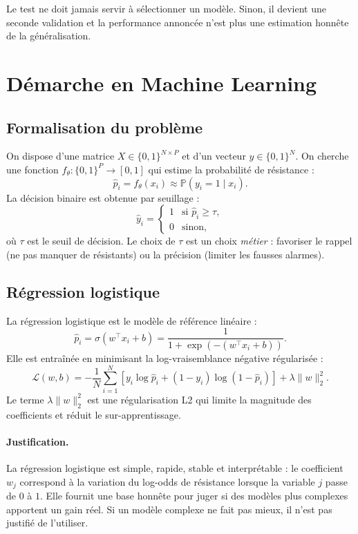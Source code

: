\documentclass[11pt,a4paper]{article}
\begin{document}
Le test ne doit jamais servir à sélectionner un modèle. Sinon, il devient une seconde validation et la performance annoncée n'est plus une estimation honnête de la généralisation.

\section{Démarche en Machine Learning}

\subsection{Formalisation du problème}

On dispose d'une matrice \(X \in \{0,1\}^{N \times P}\) et d'un vecteur \(y \in \{0,1\}^N\). On cherche une fonction \(f_\theta : \{0,1\}^P \to [0,1]\) qui estime la probabilité de résistance :
\[
\hat p_i = f_\theta(x_i) \approx \mathbb{P}(y_i = 1 \mid x_i).
\]
La décision binaire est obtenue par seuillage :
\[
\hat y_i =
\begin{cases}
1 & \text{si } \hat p_i \ge \tau,\\
0 & \text{sinon},
\end{cases}
\]
où \(\tau\) est le seuil de décision. Le choix de \(\tau\) est un choix \emph{métier} : favoriser le rappel (ne pas manquer de résistants) ou la précision (limiter les fausses alarmes).

\subsection{Régression logistique}

La régression logistique est le modèle de référence linéaire :
\[
\hat p_i = \sigma(w^\top x_i + b) = \frac{1}{1 + \exp\left(-(w^\top x_i + b)\right)}.
\]
Elle est entraînée en minimisant la log-vraisemblance négative régularisée :
\[
\mathcal{L}(w,b)
= -\frac{1}{N}\sum_{i=1}^N
\left[
y_i \log \hat p_i + (1-y_i)\log(1-\hat p_i)
\right]
+ \lambda \|w\|_2^2.
\]
Le terme \(\lambda \|w\|_2^2\) est une régularisation L2 qui limite la magnitude des coefficients et réduit le sur-apprentissage.

\paragraph{Justification.}
La régression logistique est simple, rapide, stable et interprétable : le coefficient \(w_j\) correspond à la variation du log-odds de résistance lorsque la variable \(j\) passe de $0$ à $1$. Elle fournit une base honnête pour juger si des modèles plus complexes apportent un gain réel. Si un modèle complexe ne fait pas mieux, il n'est pas justifié de l'utiliser.
\end{document}
